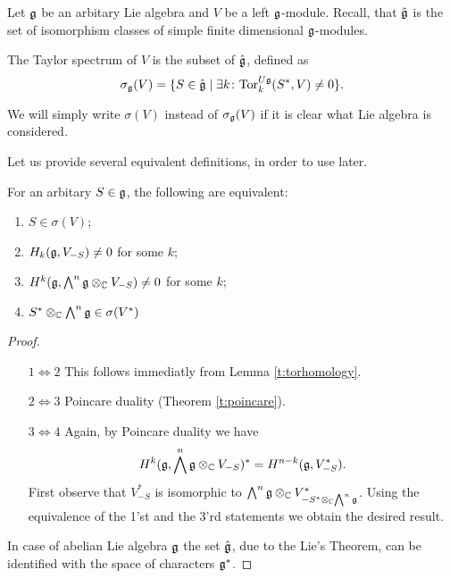 Let $\mathfrak{g}$ be an arbitary Lie algebra and $V$ be a left $\mathfrak{g}$-module.  Recall, that $\hat{\mathfrak{g}}$
is the set of isomorphism classes of simple finite dimensional $\mathfrak{g}$-modules.
\begin{definition}
    The Taylor spectrum of $V$ is the subset of $\hat{\mathfrak{g}}$, defined as
    \[
        \sigma_{\mathfrak{g}}(V)=\{ S\in \hat{\mathfrak{g}} \mid \exists 
            k \colon \mathrm{Tor}^{U\mathfrak{g}}_k(S^*,V)\neq 0\}.
    \]
\end{definition}
We will simply write $\sigma(V)$ instead of $\sigma_{\mathfrak{g}}(V)$ if it is clear what Lie algebra is
considered.

Let us provide several equivalent definitions, in order to use later.
\begin{theorem}
   For an arbitary $S\in\mathfrak{g}$, the following are equivalent:
   \begin{enumerate}
       \item $S \in \sigma(V)$; 
           
       \item $H_k(\mathfrak{g}, V_{-S}) \ne 0$ for some $k$;

       \item $H^k(\mathfrak{g}, \bigwedge^n\mathfrak{g}\otimes_{\mathbb{C}} V_{-S}) \ne 0$ for some $k$;

       \item $S^* \otimes_{\mathbb{C}} \bigwedge^n\mathfrak{g} \in \sigma(V^*)$
   \end{enumerate}
\end{theorem}
\begin{proof}
    \begin{itemize}
        \item[$1 \Leftrightarrow 2$]
            This follows immediatly from Lemma \ref{t:torhomology}.

        \item[$2 \Leftrightarrow 3$]
            Poincare duality (Theorem \ref{t:poincare}).

        \item[$3 \Leftrightarrow 4$]
            Again, by Poincare duality we have
            \[
                H^k(\mathfrak{g}, \bigwedge^n\mathfrak{g} \otimes_{\mathbb{C}} V_{-S})^* = H^{n - k} (\mathfrak{g}, V_{-S}^*).
            \]
            First observe that $V^*_{-S}$ is isomorphic to $\bigwedge^n\mathfrak{g} \otimes_{\mathbb{C}}
            V^*_{-S^* \otimes_{\mathbb{C}} \bigwedge^n\mathfrak{g}}$. Using the equivalence of the 1'st and the
            3'rd statements we obtain the desired result. 
    \end{itemize}

    In case of abelian Lie algebra $\mathfrak{g}$ the set $\hat{\mathfrak{g}}$, due to the Lie's Theorem, can be
    identified with the space of characters $\mathfrak{g}^*$. 
\end{proof}
